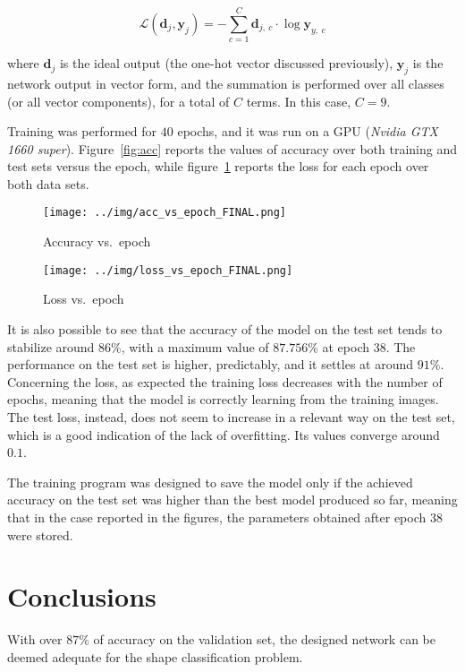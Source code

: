 \documentclass[12pt]{article}
\begin{document}
\begin{equation}
  \mathcal{L}(\textbf{d}_j, \textbf{y}_j) = - \sum_{c = 1}^{C} \textbf{d}_{j,\ c} \cdot \log{\textbf{y}_{y,\ c}}
\end{equation}

where $\textbf{d}_j$ is the ideal output (the one-hot vector discussed previously), $\textbf{y}_j$ is the network output in vector form, and the summation is performed over all classes (or all vector components), for a total of $C$ terms.
In this case, $C = 9$.

Training was performed for $40$ epochs, and it was run on a GPU (\textit{Nvidia GTX 1660 super}).
Figure\ \ref{fig:acc} reports the values of accuracy over both training and test sets versus the epoch, while figure\ \ref{fig:loss} reports the loss for each epoch over both data sets.

\begin{figure} [ht]
  \begin{minipage}{0.45\linewidth}
  \centering
    \texttt{[image: ../img/acc\_vs\_epoch\_FINAL.png]}
    \caption{Accuracy vs.\ epoch}\label{fig:acc}
  \end{minipage}
  \hspace{0.5cm}
  \begin{minipage}{0.45\linewidth}
  \centering
    \texttt{[image: ../img/loss\_vs\_epoch\_FINAL.png]}
    \caption{Loss vs.\ epoch}\label{fig:loss}
  \end{minipage}
\end{figure}

It is also possible to see that the accuracy of the model on the test set tends to stabilize around $86\%$, with a maximum value of $87.756\%$ at epoch 38.
The performance on the test set is higher, predictably, and it settles at around $91\%$.\\
Concerning the loss, as expected the training loss decreases with the number of epochs, meaning that the model is correctly learning from the training images.
The test loss, instead, does not seem to increase in a relevant way on the test set, which is a good indication of the lack of overfitting.
Its values converge around $0.1$.

The training program was designed to save the model only if the achieved accuracy on the test set was higher than the best model produced so far, meaning that in the case reported in the figures, the parameters obtained after epoch 38 were stored.

\section{Conclusions}

With over $87\%$ of accuracy on the validation set, the designed network can be deemed adequate for the shape classification problem.\\
\end{document}
